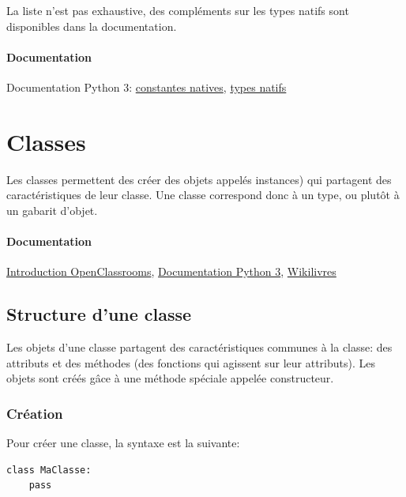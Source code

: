 \documentclass[a4paper, 10pt]{article}
\begin{document}
La liste n'est pas exhaustive, des compléments sur les types natifs sont disponibles dans la documentation.

\paragraph{Documentation} Documentation Python 3: \href{https://docs.python.org/fr/3/library/constants.html}{constantes natives}, \href{https://docs.python.org/fr/3/library/stdtypes.html}{types natifs}
%

\section{Classes}

 Les classes permettent des créer des objets appelés instances) qui partagent des caractéristiques de leur classe. Une classe correspond donc à un type, ou plutôt à un gabarit d'objet.

\paragraph{Documentation} \href{https://openclassrooms.com/courses/apprenez-a-programmer-en-python/premiere-approche-des-classes}{Introduction OpenClassrooms}, \href{https://docs.python.org/fr/3/tutorial/classes.html}{Documentation Python 3}, \href{https://fr.wikibooks.org/wiki/Programmation_Python/Classes#Définition_d'une_classe_élé mentaire}{Wikilivres}

\subsection{Structure d'une classe}
Les objets d'une classe partagent des caractéristiques communes à la classe: des attributs et des méthodes (des fonctions qui agissent sur leur attributs). Les objets sont créés g\^ace à une méthode spéciale appelée constructeur.

\subsubsection{Création}
Pour créer une classe, la syntaxe est la suivante:
\begin{verbatim}
class MaClasse:
    pass
\end{verbatim}
\end{document}
